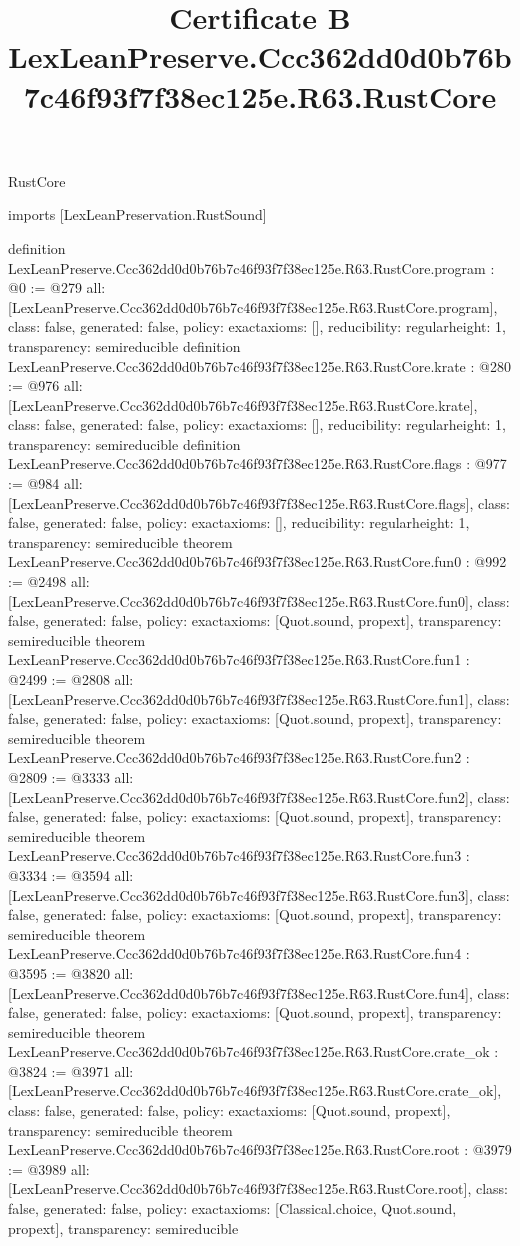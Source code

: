 \begin{lexlean}{RustCore}
\title{Certificate B LexLeanPreserve.Ccc362dd0d0b76b7c46f93f7f38ec125e.R63.RustCore}
\begin{coremodule}
imports [LexLeanPreservation.RustSound]

definition LexLeanPreserve.Ccc362dd0d0b76b7c46f93f7f38ec125e.R63.RustCore.program : @0 := @279 {
  all: [LexLeanPreserve.Ccc362dd0d0b76b7c46f93f7f38ec125e.R63.RustCore.program],
  class: false,
  generated: false,
  policy: exact{axioms: []},
  reducibility: regular{height: 1},
  transparency: semireducible
}
definition LexLeanPreserve.Ccc362dd0d0b76b7c46f93f7f38ec125e.R63.RustCore.krate : @280 := @976 {
  all: [LexLeanPreserve.Ccc362dd0d0b76b7c46f93f7f38ec125e.R63.RustCore.krate],
  class: false,
  generated: false,
  policy: exact{axioms: []},
  reducibility: regular{height: 1},
  transparency: semireducible
}
definition LexLeanPreserve.Ccc362dd0d0b76b7c46f93f7f38ec125e.R63.RustCore.flags : @977 := @984 {
  all: [LexLeanPreserve.Ccc362dd0d0b76b7c46f93f7f38ec125e.R63.RustCore.flags],
  class: false,
  generated: false,
  policy: exact{axioms: []},
  reducibility: regular{height: 1},
  transparency: semireducible
}
theorem LexLeanPreserve.Ccc362dd0d0b76b7c46f93f7f38ec125e.R63.RustCore.fun0 : @992 := @2498 {
  all: [LexLeanPreserve.Ccc362dd0d0b76b7c46f93f7f38ec125e.R63.RustCore.fun0],
  class: false,
  generated: false,
  policy: exact{axioms: [Quot.sound, propext]},
  transparency: semireducible
}
theorem LexLeanPreserve.Ccc362dd0d0b76b7c46f93f7f38ec125e.R63.RustCore.fun1 : @2499 := @2808 {
  all: [LexLeanPreserve.Ccc362dd0d0b76b7c46f93f7f38ec125e.R63.RustCore.fun1],
  class: false,
  generated: false,
  policy: exact{axioms: [Quot.sound, propext]},
  transparency: semireducible
}
theorem LexLeanPreserve.Ccc362dd0d0b76b7c46f93f7f38ec125e.R63.RustCore.fun2 : @2809 := @3333 {
  all: [LexLeanPreserve.Ccc362dd0d0b76b7c46f93f7f38ec125e.R63.RustCore.fun2],
  class: false,
  generated: false,
  policy: exact{axioms: [Quot.sound, propext]},
  transparency: semireducible
}
theorem LexLeanPreserve.Ccc362dd0d0b76b7c46f93f7f38ec125e.R63.RustCore.fun3 : @3334 := @3594 {
  all: [LexLeanPreserve.Ccc362dd0d0b76b7c46f93f7f38ec125e.R63.RustCore.fun3],
  class: false,
  generated: false,
  policy: exact{axioms: [Quot.sound, propext]},
  transparency: semireducible
}
theorem LexLeanPreserve.Ccc362dd0d0b76b7c46f93f7f38ec125e.R63.RustCore.fun4 : @3595 := @3820 {
  all: [LexLeanPreserve.Ccc362dd0d0b76b7c46f93f7f38ec125e.R63.RustCore.fun4],
  class: false,
  generated: false,
  policy: exact{axioms: [Quot.sound, propext]},
  transparency: semireducible
}
theorem LexLeanPreserve.Ccc362dd0d0b76b7c46f93f7f38ec125e.R63.RustCore.crate_ok : @3824 := @3971 {
  all: [LexLeanPreserve.Ccc362dd0d0b76b7c46f93f7f38ec125e.R63.RustCore.crate_ok],
  class: false,
  generated: false,
  policy: exact{axioms: [Quot.sound, propext]},
  transparency: semireducible
}
theorem LexLeanPreserve.Ccc362dd0d0b76b7c46f93f7f38ec125e.R63.RustCore.root : @3979 := @3989 {
  all: [LexLeanPreserve.Ccc362dd0d0b76b7c46f93f7f38ec125e.R63.RustCore.root],
  class: false,
  generated: false,
  policy: exact{axioms: [Classical.choice, Quot.sound, propext]},
  transparency: semireducible
}


\end{coremodule}
\end{lexlean}

